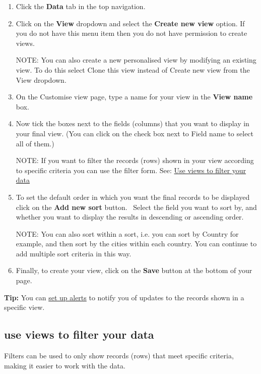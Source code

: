 \documentclass{ctrlo-int-toc}
\begin{document}
\begin{enumerate}
\item Click the \textbf{Data} tab in the top navigation.
\item Click on the \textbf{View} dropdown and select the \textbf{Create new view} option. If you do not have this menu item then you do not have permission to create views.
\begin{notebox}
NOTE: You can also create a new personalised view by modifying an existing view. To do this select Clone this view instead of Create new view from the View dropdown. 
\end{notebox}

\item On the Customise view page, type a name for your view in the \textbf{View name} box.
\item Now tick the boxes next to the fields (columns) that you want to display in your final view. (You can click on the check box next to Field name to select all of them.)
\begin{notebox}
NOTE: If you want to filter the records (rows) shown in your view according to specific criteria you can use the filter form. See: \hyperref[subsec:viewstofilter]{Use views to filter your data}
\end{notebox}

\item To set the default order in which you want the final records to be displayed click on the \textbf{Add new sort} button. \ Select the field you want to sort by, and whether you want to display the results in descending or ascending order. 
\begin{notebox}
NOTE: You can also sort within a sort, i.e. you can sort by Country for example, and then sort by the cities within each country. You can continue to add multiple sort criteria in this way.
\end{notebox}

\item Finally, to create your view, click on the \textbf{Save} button at the bottom of your page. 
\end{enumerate}
\begin{tipbox}[userdefinedwidth=15cm]
    \textbf{Tip:} You can \hyperref[subsec:setalert]{set up alerts} to notify you of updates to the records shown in a specific view.
\end{tipbox}

\subsection[use views to filter your data ]{use views to filter your data }
\label{subsec:viewstofilter}
Filters can be used to only show records (rows) that meet specific criteria, making it easier to work with the data.
\end{document}
